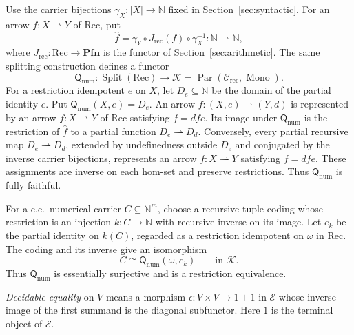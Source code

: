 \documentclass[11pt]{article}
\newcommand{\N}{\mathbb N}
\newcommand{\Pfn}{\mathbf{Pfn}}
\begin{document}
Use the carrier bijections $\gamma_X:|X|\to\N$ fixed in
Section~\ref{sec:syntactic}. For an arrow $f:X\rightharpoonup Y$
of $\mathrm{Rec}$, put
\[
 \widehat f=\gamma_Y\circ J_{\mathrm{rec}}(f)\circ\gamma_X^{-1}
 :\N\rightharpoonup\N,
\]
where $J_{\mathrm{rec}}:\mathrm{Rec}\to\Pfn$ is the functor of
Section~\ref{sec:arithmetic}. The same splitting construction
defines a functor
\[
 \mathsf Q_{\mathrm{num}}:\operatorname{Split}(\mathrm{Rec})
 \longrightarrow\mathcal K
 =\operatorname{Par}(\mathcal C_{\mathrm{rec}},\operatorname{Mono}).
\]
For a restriction idempotent $e$ on $X$, let $D_e\subseteq\N$
be the domain of the partial identity $\widehat e$.
Put $\mathsf Q_{\mathrm{num}}(X,e)=D_e$.
An arrow $f:(X,e)\rightharpoonup(Y,d)$ is represented by an arrow
$f:X\rightharpoonup Y$ of $\mathrm{Rec}$ satisfying $f=dfe$.
Its image under $\mathsf Q_{\mathrm{num}}$ is the restriction of
$\widehat f$ to a partial function $D_e\rightharpoonup D_d$.
Conversely, every partial recursive map $D_e\rightharpoonup D_d$,
extended by undefinedness outside $D_e$ and conjugated by the
inverse carrier bijections, represents an arrow
$f:X\rightharpoonup Y$ satisfying $f=dfe$. These assignments are
inverse on each hom-set and preserve restrictions. Thus
$\mathsf Q_{\mathrm{num}}$ is fully faithful.

For a c.e.\ numerical carrier $C\subseteq\N^m$, choose a recursive
tuple coding whose restriction is an injection $k:C\to\N$ with
recursive inverse on its image. Let $e_k$ be the partial identity
on $k(C)$, regarded as a restriction idempotent on $\omega$ in
$\mathrm{Rec}$. The coding and its inverse give an isomorphism
\[
 C\cong\mathsf Q_{\mathrm{num}}(\omega,e_k)
 \qquad\text{in }\mathcal K.
\]
Thus $\mathsf Q_{\mathrm{num}}$ is essentially surjective and is a
restriction equivalence.

\emph{Decidable equality} on $V$ means a morphism
$\epsilon:V\times V\to1+1$ in $\mathcal E$ whose inverse image of
the first summand is the diagonal subfunctor. Here $1$ is the terminal object of $\mathcal E$.
\end{document}

